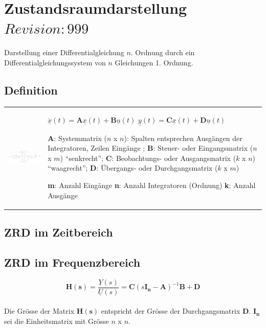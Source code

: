 \section{Zustandsraumdarstellung  \tiny{$Revision: 999 $}}
Darstellung einer Differentialgleichung $n$. Ordnung durch ein
Differentialgleichungssystem von $n$ Gleichungen 1. Ordnung.

\subsection{Definition }
\begin{tabular}{ll}
\parbox{10cm}{
	\includegraphics[width=10cm]{./images/zrd-schema.png}
	}
	& \parbox{8cm}{
		$\dot{\underline{x}}(t) = {\boldsymbol A} \underline{x}(t) + {\boldsymbol B}
		\underline{u}(t)$ \\
		$\underline{y}(t) = {\boldsymbol C} \underline{x}(t) + {\boldsymbol D}
		\underline{u}(t)$\\ 
		
		${\boldsymbol A}$: Systemmatrix ($n$ x $n$): Spalten entsprechen Ausgängen
		der Integratoren, Zeilen Eingänge ; \\ 
		${\boldsymbol B}$: Steuer- oder
		Eingangsmatrix ($n$ x $m$) ``senkrecht''; \\ ${\boldsymbol C}$: Beobachtungs- oder Ausgangsmatrix ($k$ x $n$)
		``waagrecht''; \\
		${\boldsymbol D}$: Übergangs- oder Durchgangsmatrix ($k$ x
		$m$)\\
		
		\textbf{m}: Anzahl Eingänge \\
		\textbf{n}: Anzahl Integratoren (Ordnung) \\
		\textbf{k}: Anzahl Ausgänge
	}
 \end{tabular}

\subsection{ZRD im Zeitbereich }

\subsection{ZRD im Frequenzbereich  }
$$\boldsymbol{H(s)} = \frac{\underline{Y}(s)}{\underline{U}(s)} =
\boldsymbol{C}\left(s\boldsymbol{I_n}-\boldsymbol{A}\right)^{-1}\boldsymbol{B}+\boldsymbol{D}$$
\\
Die Grösse der Matrix $\boldsymbol {H(s)}$ entspricht der Grösse der
Durchgangsmatrix $\boldsymbol D$. $\boldsymbol{I_n}$ sei die Einheitsmatrix mit
Grösse $n$ x $n$.

